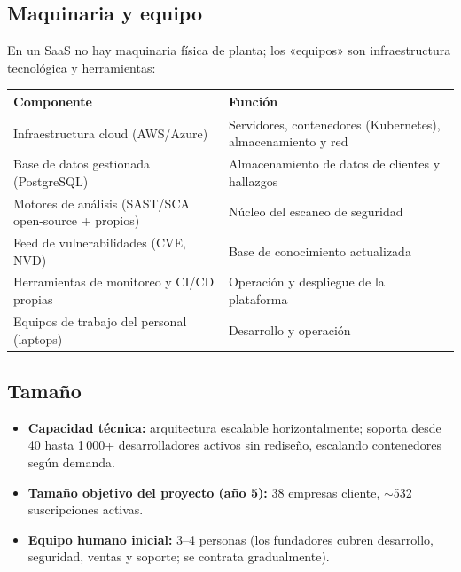 \subsection{Maquinaria y equipo}
En un SaaS no hay maquinaria física de planta; los «equipos» son infraestructura
tecnológica y herramientas:

\begin{table}[ht]
  \centering
  \begin{tabularx}{\linewidth}{l Y}
    \toprule
    \textbf{Componente} & \textbf{Función} \\
    \midrule
    Infraestructura cloud (AWS/Azure) & Servidores, contenedores (Kubernetes), almacenamiento y red \\
    Base de datos gestionada (PostgreSQL) & Almacenamiento de datos de clientes y hallazgos \\
    Motores de análisis (SAST/SCA open-source + propios) & Núcleo del escaneo de seguridad \\
    Feed de vulnerabilidades (CVE, NVD) & Base de conocimiento actualizada \\
    Herramientas de monitoreo y CI/CD propias & Operación y despliegue de la plataforma \\
    Equipos de trabajo del personal (laptops) & Desarrollo y operación \\
    \bottomrule
  \end{tabularx}
\end{table}

\subsection{Tamaño}
\begin{itemize}
  \item \textbf{Capacidad técnica:} arquitectura escalable horizontalmente; soporta
        desde 40 hasta 1\,000+ desarrolladores activos sin rediseño, escalando
        contenedores según demanda.
  \item \textbf{Tamaño objetivo del proyecto (año 5):} 38 empresas cliente,
        $\sim$532 suscripciones activas.
  \item \textbf{Equipo humano inicial:} 3--4 personas (los fundadores cubren
        desarrollo, seguridad, ventas y soporte; se contrata gradualmente).
\end{itemize}


